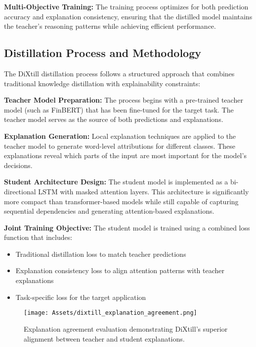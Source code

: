\textbf{Multi-Objective Training:} The training process optimizes for both prediction accuracy and explanation consistency, ensuring that the distilled model maintains the teacher's reasoning patterns while achieving efficient performance.

\subsection{Distillation Process and Methodology}

The DiXtill distillation process follows a structured approach that combines traditional knowledge distillation with explainability constraints:

\textbf{Teacher Model Preparation:} The process begins with a pre-trained teacher model (such as FinBERT) that has been fine-tuned for the target task. The teacher model serves as the source of both predictions and explanations.


\textbf{Explanation Generation:} Local explanation techniques are applied to the teacher model to generate word-level attributions for different classes. These explanations reveal which parts of the input are most important for the model's decisions.

\textbf{Student Architecture Design:} The student model is implemented as a bi-directional LSTM with masked attention layers. This architecture is significantly more compact than transformer-based models while still capable of capturing sequential dependencies and generating attention-based explanations.

\textbf{Joint Training Objective:} The student model is trained using a combined loss function that includes:
\begin{itemize}
    \item Traditional distillation loss to match teacher predictions
    \item Explanation consistency loss to align attention patterns with teacher explanations
    \item Task-specific loss for the target application
\end{itemize}

\begin{figure}[H]
    \centering
    \texttt{[image: Assets/dixtill\_explanation\_agreement.png]}
    \caption{Explanation agreement evaluation demonstrating DiXtill's superior alignment between teacher and student explanations.\cite{XaiDrivenKnowledge}}
    \label{fig:dixtill_explanation_agreement}
\end{figure}

